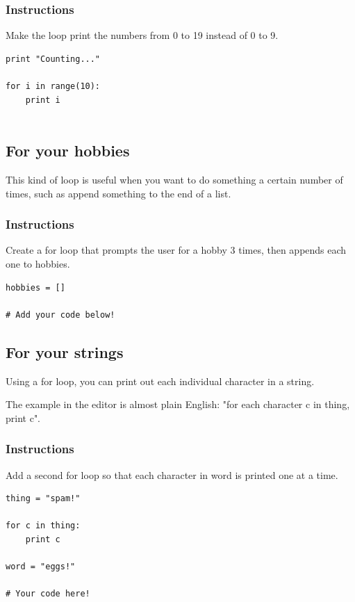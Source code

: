 \documentclass[12pt,a4paper,final,twoside,onecolumn,titlepage]{book}
\begin{document}
\subsubsection{Instructions}

Make the loop print the numbers from 0 to 19 instead of 0 to 9.
\begin{lstlisting}
print "Counting..."

for i in range(10):
    print i
    
\end{lstlisting}

\subsection{For your hobbies}

This kind of loop is useful when you want to do something a certain number of times, such as append something to the end of a list.
\subsubsection{Instructions}

Create a for loop that prompts the user for a hobby 3 times, then appends each one to hobbies.

\begin{lstlisting}
hobbies = []

# Add your code below!
\end{lstlisting}

\subsection{For your strings}

Using a for loop, you can print out each individual character in a string.

The example in the editor is almost plain English: "for each character c in thing, print c".
\subsubsection{Instructions}

Add a second for loop so that each character in word is printed one at a time.
\begin{lstlisting}
thing = "spam!"

for c in thing:
    print c

word = "eggs!"

# Your code here!

\end{lstlisting}
\end{document}
